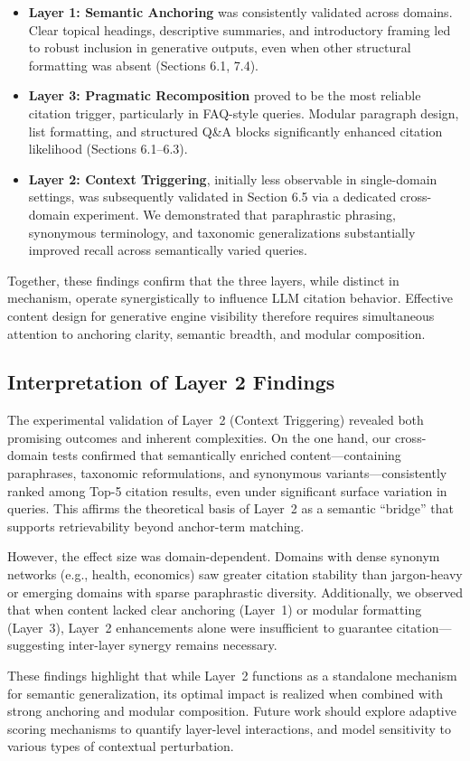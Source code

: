 \begin{itemize}
  \item \textbf{Layer 1: Semantic Anchoring} was consistently validated across domains. Clear topical headings, descriptive summaries, and introductory framing led to robust inclusion in generative outputs, even when other structural formatting was absent (Sections 6.1, 7.4).
  
  \item \textbf{Layer 3: Pragmatic Recomposition} proved to be the most reliable citation trigger, particularly in FAQ-style queries. Modular paragraph design, list formatting, and structured Q\&A blocks significantly enhanced citation likelihood (Sections 6.1–6.3).
  
  \item \textbf{Layer 2: Context Triggering}, initially less observable in single-domain settings, was subsequently validated in Section 6.5 via a dedicated cross-domain experiment. We demonstrated that paraphrastic phrasing, synonymous terminology, and taxonomic generalizations substantially improved recall across semantically varied queries.
\end{itemize}

Together, these findings confirm that the three layers, while distinct in mechanism, operate synergistically to influence LLM citation behavior. Effective content design for generative engine visibility therefore requires simultaneous attention to anchoring clarity, semantic breadth, and modular composition.

\subsection{Interpretation of Layer 2 Findings}

The experimental validation of Layer 2 (Context Triggering) revealed both promising outcomes and inherent complexities. On the one hand, our cross-domain tests confirmed that semantically enriched content—containing paraphrases, taxonomic reformulations, and synonymous variants—consistently ranked among Top-5 citation results, even under significant surface variation in queries. This affirms the theoretical basis of Layer 2 as a semantic “bridge” that supports retrievability beyond anchor-term matching.

However, the effect size was domain-dependent. Domains with dense synonym networks (e.g., health, economics) saw greater citation stability than jargon-heavy or emerging domains with sparse paraphrastic diversity. Additionally, we observed that when content lacked clear anchoring (Layer 1) or modular formatting (Layer 3), Layer 2 enhancements alone were insufficient to guarantee citation—suggesting inter-layer synergy remains necessary.

These findings highlight that while Layer 2 functions as a standalone mechanism for semantic generalization, its optimal impact is realized when combined with strong anchoring and modular composition. Future work should explore adaptive scoring mechanisms to quantify layer-level interactions, and model sensitivity to various types of contextual perturbation.
